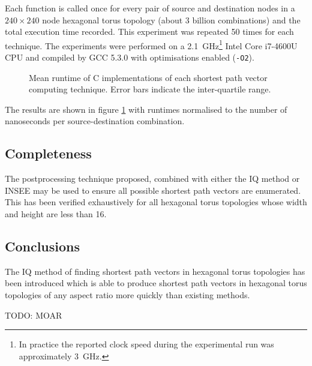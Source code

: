 			Each function is called once for every pair of source and destination
			nodes in a $240\times240$ node hexagonal torus topology (about 3 billion
			combinations) and the total execution time recorded. This experiment was
			repeated 50 times for each technique. The experiments were performed on a
			\SI{2.1}{\giga\hertz}\footnote{In practice the reported clock speed
			during the experimental run was approximately \SI{3}{\giga\hertz}.} Intel
			Core i7-4600U CPU and compiled by GCC 5.3.0 with optimisations enabled
			(\verb|-O2|).
			
			\begin{figure}
				\center
				
				\caption{Mean runtime of C implementations of each shortest path vector
				computing technique. Error bars indicate the inter-quartile range.}
				\label{fig:shortest-path-vector-runtimes}
			\end{figure}
			
			The results are shown in figure \ref{fig:shortest-path-vector-runtimes}
			with runtimes normalised to the number of nanoseconds per
			source-destination combination.
		
		\subsection{Completeness}
			
			The postprocessing technique proposed, combined with either the IQ method
			or INSEE may be used to ensure all possible shortest path vectors are
			enumerated. This has been verified exhaustively for all hexagonal torus
			topologies whose width and height are less than 16.
		
	\subsection{Conclusions}
		
		The IQ method of finding shortest path vectors in hexagonal torus
		topologies has been introduced which is able to produce shortest path
		vectors in hexagonal torus topologies of any aspect ratio more quickly than
		existing methods.
		
		TODO: MOAR

